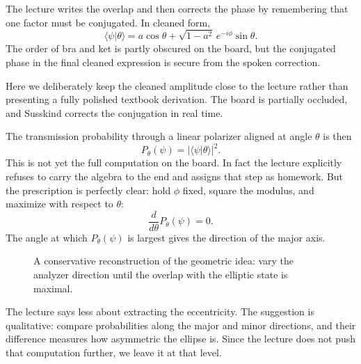 The lecture writes the overlap and then corrects the phase by remembering that one factor must be conjugated. In cleaned form,
\begin{equation}
\langle\psi|\theta\rangle
=
a\cos\theta+\sqrt{1-a^2}\,e^{-i\phi}\sin\theta.
\end{equation}
The order of bra and ket is partly obscured on the board, but the conjugated phase in the final cleaned expression is secure from the spoken correction.

\begin{remark}
Here we deliberately keep the cleaned amplitude close to the lecture rather than presenting a fully polished textbook derivation. The board is partially occluded, and Susskind corrects the conjugation in real time.
\end{remark}

The transmission probability through a linear polarizer aligned at angle $\theta$ is then
\begin{equation}
P_\theta(\psi)=|\langle\psi|\theta\rangle|^2.
\end{equation}
This is not yet the full computation on the board. In fact the lecture explicitly refuses to carry the algebra to the end and assigns that step as homework. But the prescription is perfectly clear: hold $\phi$ fixed, square the modulus, and maximize with respect to $\theta$:
\begin{equation}
\frac{d}{d\theta}P_\theta(\psi)=0.
\end{equation}
The angle at which $P_\theta(\psi)$ is largest gives the direction of the major axis.

\begin{figure}[t]
\centering
{}
\caption{A conservative reconstruction of the geometric idea: vary the analyzer direction until the overlap with the elliptic state is maximal.}
\end{figure}

The lecture says less about extracting the eccentricity. The suggestion is qualitative: compare probabilities along the major and minor directions, and their difference measures how asymmetric the ellipse is. Since the lecture does not push that computation further, we leave it at that level.

